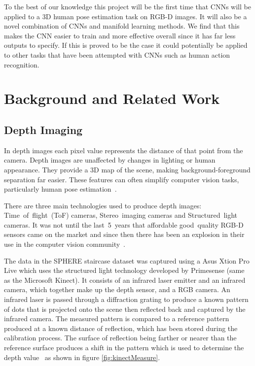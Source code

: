 \documentclass[11pt]{article} %
\begin{document}

To the best of our knowledge this project will be the first time that CNNs will be applied to a 3D human pose estimation task on RGB-D images. It will also be a novel combination of CNNs and manifold learning methods. We find that this makes the CNN easier to train and more effective overall since it has far less outputs to specify. If this is proved to be the case it could potentially be applied to other tasks that have been attempted with CNNs such as human action recognition.




\section{Background and Related Work}

\subsection{Depth Imaging}
\label{sec:Depth}


In depth images each pixel value represents the distance of that point from the camera. Depth images are unaffected by changes in lighting or human appearance. They provide a 3D map of the scene, making background-foreground separation far easier. These features can often simplify computer vision tasks, particularly human pose estimation~\cite{Chen2013}.

There are three main technologies used to produce depth images: Time~of~flight~(ToF) cameras, Stereo~imaging cameras and Structured~light cameras. It was not until the last~5~years that affordable good~quality RGB-D sensors came on the market and since then there has been an explosion in their use in the computer vision community~\cite{Han2013}.

The data in the SPHERE staircase dataset was captured using a Asus Xtion Pro Live which uses the structured light technology developed by Primesense (same as the Microsoft Kinect). It consists of an infrared laser emitter and an infrared camera, which together make up the depth sensor, and a RGB camera. An infrared laser is passed through a diffraction grating to produce a known pattern of dots that is projected onto the scene then reflected back and captured by the infrared camera. The measured pattern is compared to a reference pattern produced at a known distance of reflection, which has been stored during the calibration process. The surface of reflection being farther or nearer than the reference surface produces a shift in the pattern which is used to determine the depth value~\cite{Zhang2012a,Khoshelham2012a} as shown in figure \ref{fig:kinectMeasure}.
\end{document}
